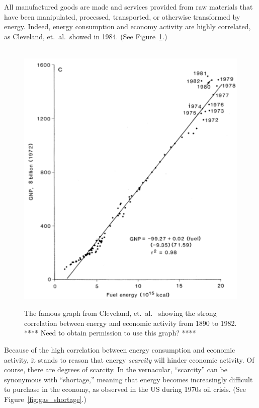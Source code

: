 All manufactured goods are made and services provided
from raw materials that have been
manipulated, processed, transported, or otherwise transformed by energy.
Indeed, energy consumption and economy activity are highly correlated,
as Cleveland, et.\ al.\ showed in 1984. 
(See Figure~\ref{fig:Cleveland1984}.)

\begin{figure}[!ht]
\centering\
\includegraphics[width=\linewidth]{Part_0/Chapter_Introduction/images/Cleveland1984.pdf}
\caption[Energy and economic activity]{The famous graph from Cleveland, et.\ al.\
\cite{Cleveland:1984aa} showing the strong correlation 
between energy and economic activity from 1890 to 1982.
**** Need to obtain permission to use this graph? ****}
\label{fig:Cleveland1984}
\end{figure}

Because of the high correlation between energy consumption and economic activity,
it stands to reason that energy \emph{scarcity} will hinder economic activity.
Of course, there are degrees of scarcity. 
In the vernacular, ``scarcity'' can be synonymous with ``shortage,''
meaning that energy becomes increasingly difficult to purchase in the economy,
as observed in the US during 1970s oil crisis.
(See Figure~\ref{fig:gas_shortage}.)

